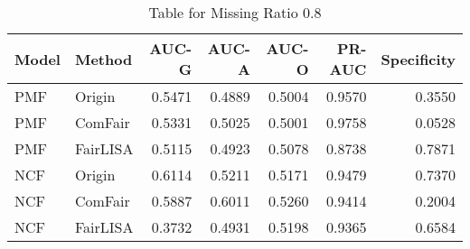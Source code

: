 \begin{table}
\centering
\caption{Table for Missing Ratio 0.8}
\label{tab:missing_0.8}
\begin{tabular}{llrrrrr}
\toprule
Model &   Method &  AUC-G &  AUC-A &  AUC-O &  PR-AUC &  Specificity \\
\midrule
  PMF &   Origin & 0.5471 & 0.4889 & 0.5004 &  0.9570 &       0.3550 \\
  PMF &  ComFair & 0.5331 & 0.5025 & 0.5001 &  0.9758 &       0.0528 \\
  PMF & FairLISA & 0.5115 & 0.4923 & 0.5078 &  0.8738 &       0.7871 \\
  NCF &   Origin & 0.6114 & 0.5211 & 0.5171 &  0.9479 &       0.7370 \\
  NCF &  ComFair & 0.5887 & 0.6011 & 0.5260 &  0.9414 &       0.2004 \\
  NCF & FairLISA & 0.3732 & 0.4931 & 0.5198 &  0.9365 &       0.6584 \\
\bottomrule
\end{tabular}
\end{table}
